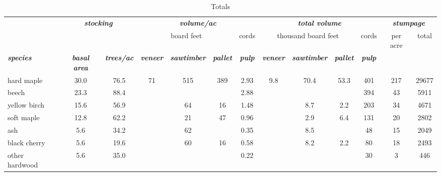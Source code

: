 \documentclass[landscape]{article}
\begin{document}
\begin{table}[H]

\caption{\label{tab:unnamed-chunk-65}Totals}
\fontsize{10}{12}\selectfont
\begin{tabular}[t]{lcccccccccccc}
\toprule
\multicolumn{1}{c}{\em{\textbf{ }}} & \multicolumn{2}{c}{\em{\textbf{stocking}}} & \multicolumn{4}{c}{\em{\textbf{volume/ac }}} & \multicolumn{4}{c}{\em{\textbf{total volume}}} & \multicolumn{2}{c}{\em{\textbf{stumpage}}} \\
\cmidrule(l{3pt}r{3pt}){2-3} \cmidrule(l{3pt}r{3pt}){4-7} \cmidrule(l{3pt}r{3pt}){8-11} \cmidrule(l{3pt}r{3pt}){12-13}
\multicolumn{3}{c}{ } & \multicolumn{3}{c}{board feet} & \multicolumn{1}{c}{cords} & \multicolumn{3}{c}{thousand board feet} & \multicolumn{1}{c}{cords} & \multicolumn{1}{c}{per acre} & \multicolumn{1}{c}{total} \\
\cmidrule(l{3pt}r{3pt}){4-6} \cmidrule(l{3pt}r{3pt}){7-7} \cmidrule(l{3pt}r{3pt}){8-10} \cmidrule(l{3pt}r{3pt}){11-11} \cmidrule(l{3pt}r{3pt}){12-12} \cmidrule(l{3pt}r{3pt}){13-13}
\rowcolor[HTML]{DCDCDC}  \em{\textbf{species}} & \em{\textbf{basal area}} & \em{\textbf{trees/ac}} & \em{\textbf{veneer}} & \em{\textbf{sawtimber}} & \em{\textbf{pallet}} & \em{\textbf{pulp}} & \em{\textbf{veneer}} & \em{\textbf{sawtimber}} & \em{\textbf{pallet}} & \em{\textbf{pulp}} & \em{\textbf{ }} & \em{\textbf{ }}\\
\midrule
\rowcolor{gray!6}  hard maple & 30.0 & 76.5 & 71 & 515 & 389 & 2.93 & 9.8 & 70.4 & 53.3 & 401 & 217 & 29677\\
 
beech & 23.3 & 88.4 &  &  &  & 2.88 &  &  &  & 394 & 43 & 5911\\
 
\rowcolor{gray!6}  yellow birch & 15.6 & 56.9 &  & 64 & 16 & 1.48 &  & 8.7 & 2.2 & 203 & 34 & 4671\\
 
soft maple & 12.8 & 62.2 &  & 21 & 47 & 0.96 &  & 2.9 & 6.4 & 131 & 20 & 2802\\
 
\rowcolor{gray!6}  ash & 5.6 & 34.2 &  & 62 &  & 0.35 &  & 8.5 &  & 48 & 15 & 2049\\
 
black cherry & 5.6 & 19.6 &  & 60 & 16 & 0.58 &  & 8.2 & 2.2 & 80 & 18 & 2493\\
 
\rowcolor{gray!6}  other hardwood & 5.6 & 35.0 &  &  &  & 0.22 &  &  &  & 30 & 3 & 446\\
 

\end{tabular}
\end{table}
\end{document}
